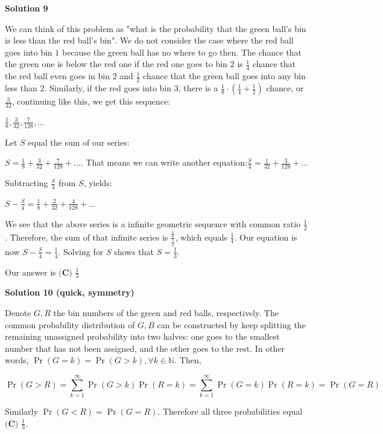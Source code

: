 \begin{enumerate}
 



\textbf{Solution 9}

We can think of this problem as "what is the probability that the green ball's bin is less than the red ball's bin". We do not consider the case where the red ball goes into bin $1$ because the green ball has no where to go then. The chance that the green one is below the red one if the red one goes to bin $2$ is $\frac{1}{4}$ chance that the red ball even goes in bin $2$ and $\frac{1}{2}$ chance that the green ball goes into any bin less than $2$. Similarly, if the red goes into bin $3$, there is a $\frac{1}{8} \cdot \left(\frac{1}{4} + \frac{1}{2}\right)$ chance, or $\frac{3}{32}$, continuing like this, we get this sequence:

 $\frac{1}{8}, \frac{3}{32}, \frac{7}{128}, ...$

 Let $S$ equal the sum of our series:

 $S = \frac{1}{8} + \frac{3}{32} + \frac{7}{128} + ...$. That means we can write another equation:$\frac{S}{4} = \frac{1}{32} + \frac{3}{128} + ...$

 Subtracting $\frac{S}{4}$ from $S$, yields:

 $S - \frac{S}{4} = \frac{1}{8} + \frac{2}{32} + \frac{4}{128} + ...$

 We see that the above series is a infinite geometric sequence with common ratio $\frac{1}{2}$. Therefore, the sum of that infinite series is $\frac{\frac{1}{8}}{\frac{1}{2}}$, which equals $\frac{1}{4}$. Our equation is now $S - \frac{S}{4} = \frac{1}{4}$. Solving for $S$ shows that $S = \frac{1}{3}$.

 Our answer is $\boxed{\textbf{(C) }\frac{1}{3}}$




\textbf{Solution 10 (quick, symmetry)}

Denote $G,R$ the bin numbers of the green and red balls, respectively. The common probability distribution of $G,B$ can be constructed by keep splitting the remaining unassigned probability into two halves: one goes to the smallest number that has not been assigned, and the other goes to the rest. In other words, $\Pr(G=k) = \Pr (G>k), \forall k \in \mathbb{N}$. Then,

 
 \[\Pr(G>R)=\sum_{k=1}^\infty \Pr(G>k) \Pr(R=k) = \sum_{k=1}^\infty \Pr(G=k) \Pr(R=k) = \Pr (G=R)\]

 Similarly $\Pr(G<R)=\Pr(G=R)$. Therefore all three probabilities equal $\boxed{\textbf{(C) }\frac{1}{3}}$.


\end{enumerate}
